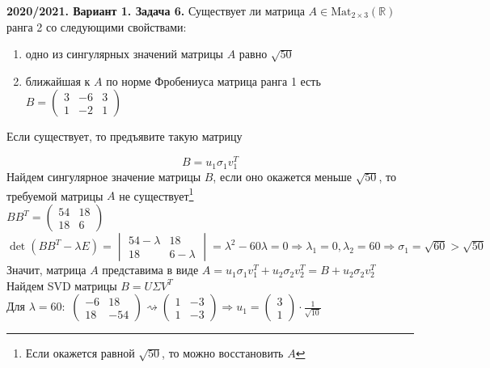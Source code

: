\documentclass[a4paper]{article}
\begin{document}
\begin{tcolorbox}[colback=blue!20!white, colframe=black!100!black]
    \textbf{2020/2021. Вариант 1. Задача 6.} Существует ли матрица $A\in\text{Mat}_{2\times3}(\mathbb{R})$ ранга 2 со следующими свойствами:
    \begin{enumerate}
        \item одно из сингулярных значений матрицы $A$ равно $\sqrt{50}$
        \item ближайшая к $A$ по норме Фробениуса матрица ранга 1 есть $B=\begin{pmatrix}
            3&-6&3\\
            1&-2&1
        \end{pmatrix}$
    \end{enumerate}
    Если существует, то предъявите такую матрицу
\end{tcolorbox}
\begin{equation*}
    B=u_1\sigma_1 v_1^T
\end{equation*}
\indent Найдем сингулярное значение матрицы $B$, если оно окажется меньше $\sqrt{50}$, то требуемой матрицы $A$ не существует\footnote{Если окажется равной $\sqrt{50}$, то можно восстановить $A$}\\[2mm]
\indent $BB^T=\begin{pmatrix}
    54&18\\
    18&6
\end{pmatrix}$\\[2mm]
\indent $\det{(BB^T-\lambda E)}=\begin{vmatrix}
    54-\lambda&18\\
    18&6-\lambda
\end{vmatrix}=\lambda^2-60\lambda=0\Longrightarrow \lambda_1=0,\lambda_2=60\Longrightarrow\sigma_1=\sqrt{60}>\sqrt{50}$\\[2mm]
\indent Значит, матрица $A$ представима в виде $A=u_1\sigma_1 v_1^T+u_2\sigma_2 v_2^T=B+u_2\sigma_2 v_2^T$\\[2mm]
\indent Найдем SVD матрицы $B=U\Sigma V^T$\\[2mm]
$\boxed{\text{Для } \lambda=60:}$ $\begin{pmatrix}
    -6&18\\
    18&-54
\end{pmatrix}\rightsquigarrow\begin{pmatrix}
    1&-3\\
    1&-3
\end{pmatrix}\Longrightarrow u_1=\begin{pmatrix}
    3\\
    1
\end{pmatrix}\cdot\displaystyle\frac{1}{\sqrt{10}}$\\[2mm]
\end{document}
